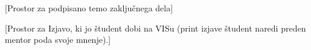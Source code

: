 %

\newpage

\mbox{}\thispagestyle{empty}
\newpage


\newpage


\thispagestyle{empty}
[Prostor za podpisano temo zaključnega dela]
\newpage

\pagestyle{fancy_nohead}

\newpage

\thispagestyle{empty}
[Prostor za Izjavo, ki jo študent dobi na VISu (print izjave študent naredi preden mentor poda svoje mnenje).]
\newpage


\newpage

 